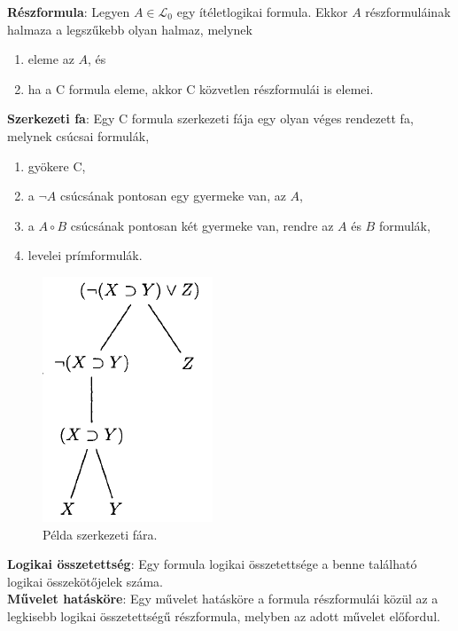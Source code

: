 \documentclass[margin=0px]{article}
\begin{document}
	\noindent \textbf{Részformula}: Legyen $A \in \mathcal{L}_{0}$ egy ítéletlogikai formula. Ekkor $A$ részformuláinak
	halmaza a legszűkebb olyan halmaz, melynek
	\begin{enumerate}
		\item	eleme az $A$, és
		
		\item	ha a C formula eleme, akkor C közvetlen részformulái is elemei.
		
	\end{enumerate}
	
	\noindent \textbf{Szerkezeti fa}: Egy C formula szerkezeti fája egy olyan véges rendezett fa, melynek csúcsai formulák,
	\begin{enumerate}
		\item	gyökere C,
		
		\item	a $\neg A$ csúcsának pontosan egy gyermeke van, az $A$,
		
		\item	a $A \circ B$ csúcsának pontosan két gyermeke van, rendre az $A$ és $B$ formulák,
		
		\item	levelei prímformulák.
	\end{enumerate}
	
	\begin{figure}[H]
		\centering
		\includegraphics[width=0.3\linewidth]{img/szerkfa}
		\caption{Példa szerkezeti fára.}
		\label{fig:szerkfa}
	\end{figure}
	
	\noindent \textbf{Logikai összetettség}: Egy formula logikai összetettsége a benne található logikai összekötőjelek száma.\\
	
	\noindent \textbf{Művelet hatásköre}: Egy művelet hatásköre a formula részformulái közül az
	a legkisebb logikai összetettségű részformula, melyben az adott művelet előfordul.\\
	
\end{document}
